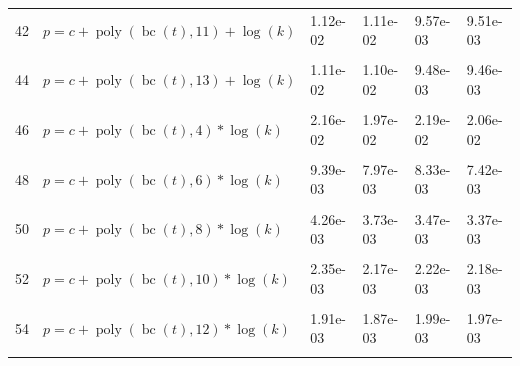 \documentclass[12pt,a4paper]{article}
\DeclareMathOperator{\bc}{bc}
\DeclareMathOperator{\poly}{poly}
\begin{document}
\begin{longtable}[t]{ll>{\raggedleft\arraybackslash}p{2cm}>{\raggedleft\arraybackslash}p{2cm}>{\raggedleft\arraybackslash}p{2cm}>{\raggedleft\arraybackslash}p{2cm}}
42 & $p = c + \poly\left( \bc(t), 11 \right) + \log(k)$ & 1.12e-02 & 1.11e-02 & 9.57e-03 & 9.51e-03\\
\cellcolor{gray!6}{43} & \cellcolor{gray!6}{$p = c + \poly\left( \bc(t), 12 \right) + \log(k)$} & \cellcolor{gray!6}{1.11e-02} & \cellcolor{gray!6}{1.11e-02} & \cellcolor{gray!6}{9.52e-03} & \cellcolor{gray!6}{9.49e-03}\\
44 & $p = c + \poly\left( \bc(t), 13 \right) + \log(k)$ & 1.11e-02 & 1.10e-02 & 9.48e-03 & 9.46e-03\\
\cellcolor{gray!6}{45} & \cellcolor{gray!6}{$p = c + \poly\left( \bc(t), 3 \right) * \log(k)$} & \cellcolor{gray!6}{2.76e-02} & \cellcolor{gray!6}{1.87e-02} & \cellcolor{gray!6}{1.94e-02} & \cellcolor{gray!6}{1.82e-02}\\
46 & $p = c + \poly\left( \bc(t), 4 \right) * \log(k)$ & 2.16e-02 & 1.97e-02 & 2.19e-02 & 2.06e-02\\
\cellcolor{gray!6}{47} & \cellcolor{gray!6}{$p = c + \poly\left( \bc(t), 5 \right) * \log(k)$} & \cellcolor{gray!6}{1.69e-02} & \cellcolor{gray!6}{1.61e-02} & \cellcolor{gray!6}{1.36e-02} & \cellcolor{gray!6}{1.33e-02}\\
48 & $p = c + \poly\left( \bc(t), 6 \right) * \log(k)$ & 9.39e-03 & 7.97e-03 & 8.33e-03 & 7.42e-03\\
\cellcolor{gray!6}{49} & \cellcolor{gray!6}{$p = c + \poly\left( \bc(t), 7 \right) * \log(k)$} & \cellcolor{gray!6}{8.05e-03} & \cellcolor{gray!6}{6.84e-03} & \cellcolor{gray!6}{7.35e-03} & \cellcolor{gray!6}{6.49e-03}\\
50 & $p = c + \poly\left( \bc(t), 8 \right) * \log(k)$ & 4.26e-03 & 3.73e-03 & 3.47e-03 & 3.37e-03\\
\cellcolor{gray!6}{51} & \cellcolor{gray!6}{$p = c + \poly\left( \bc(t), 9 \right) * \log(k)$} & \cellcolor{gray!6}{3.75e-03} & \cellcolor{gray!6}{3.38e-03} & \cellcolor{gray!6}{3.66e-03} & \cellcolor{gray!6}{3.40e-03}\\
52 & $p = c + \poly\left( \bc(t), 10 \right) * \log(k)$ & 2.35e-03 & 2.17e-03 & 2.22e-03 & 2.18e-03\\
\cellcolor{gray!6}{53} & \cellcolor{gray!6}{$p = c + \poly\left( \bc(t), 11 \right) * \log(k)$} & \cellcolor{gray!6}{2.04e-03} & \cellcolor{gray!6}{1.97e-03} & \cellcolor{gray!6}{2.14e-03} & \cellcolor{gray!6}{2.08e-03}\\
54 & $p = c + \poly\left( \bc(t), 12 \right) * \log(k)$ & 1.91e-03 & 1.87e-03 & 1.99e-03 & 1.97e-03\\
\cellcolor{gray!6}{55} & \cellcolor{gray!6}{$p = c + \poly\left( \bc(t), 13 \right) * \log(k)$} & \cellcolor{gray!6}{1.74e-03} & \cellcolor{gray!6}{1.73e-03} & \cellcolor{gray!6}{1.91e-03} & \cellcolor{gray!6}{1.91e-03}\\

\end{longtable}
\end{document}
